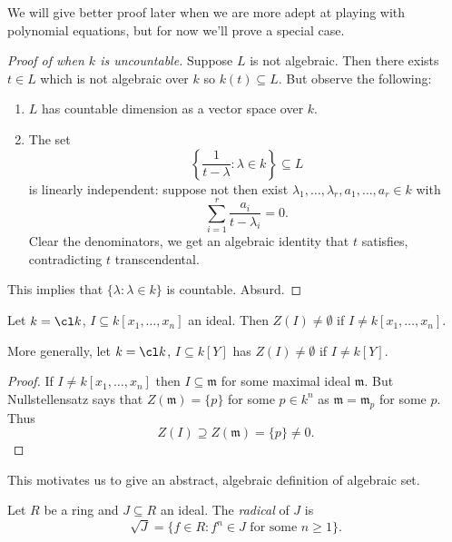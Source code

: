 \documentclass[a4paper]{article}
\begin{document}
We will give better proof later when we are more adept at playing with polynomial equations, but for now we'll prove a special case.

\begin{proof}[Proof of  when \(k\) is uncountable]
  Suppose \(L\) is not algebraic. Then there exists \(t \in L\) which is not algebraic over \(k\) so \(k(t) \subseteq L\). But observe the following:
  \begin{enumerate}
  \item \(L\) has countable dimension as a vector space over \(k\).
  \item The set
    \[
      \left\{ \frac{1}{t - \lambda}: \lambda \in k\right\} \subseteq L
    \]
    is linearly independent: suppose not then exist \(\lambda_1, \dots, \lambda_r, a_1, \dots, a_r \in k\) with
    \[
      \sum_{i = 1}^r \frac{a_i}{t - \lambda_i} = 0.
    \]
    Clear the denominators, we get an algebraic identity that \(t\) satisfies, contradicting \(t\) transcendental.
  \end{enumerate}
  This implies that \(\{\lambda: \lambda \in k\}\) is countable. Absurd.
\end{proof}


\begin{corollary}[Nullstellensatz]
  Let \(k = \cl k\), \(I \subseteq k[x_1, \dots, x_n]\) an ideal. Then \(Z(I) \neq \emptyset\) if \(I \neq k[x_1, \dots, x_n]\).

  More generally, let \(k = \cl k\), \(I \subseteq k[Y]\) has \(Z(I) \neq \emptyset\) if \(I \neq k[Y]\).
\end{corollary}

\begin{proof}
  If \(I \neq k[x_1, \dots, x_n]\) then \(I \subseteq \mathfrak m\) for some maximal ideal \(\mathfrak m\). But Nullstellensatz says that \(Z(\mathfrak m) = \{p\}\) for some \(p \in k^n\) as \(\mathfrak m = \mathfrak m_p\) for some \(p\). Thus
  \[
    Z(I) \supseteq Z(\mathfrak m) = \{p\} \neq 0.
  \]
\end{proof}

This motivates us to give an abstract, algebraic definition of algebraic set.

\begin{definition}[radical]
  Let \(R\) be a ring and \(J \subseteq R\) an ideal. The \emph{radical} of \(J\) is
  \[
    \sqrt J = \{f \in R: f^n \in J \text{ for some } n \geq 1\}.
  \]
\end{definition}
\end{document}
